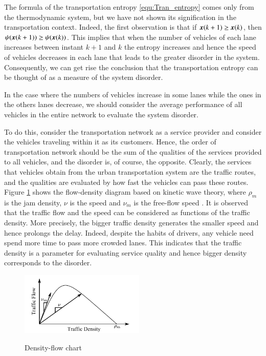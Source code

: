 \documentclass[preprint,authoryear,12pt]{elsarticle}
\renewcommand{\vec}[1]{\mbox{\boldmath$#1$}}
\begin{document}
The formula of the transportation entropy \eqref{equ:Tran_entropy}
comes only from the thermodynamic system, but we have not shown its
signification in the transportation context. Indeed, the first observation 
  is that if $\vec{x}(k+1)\geq \vec{x}(k)$, then $\psi(\vec{x}(k+1))\geq \psi(\vec{x}(k))$. This implies that 
  when the number of
vehicles of each lane increases between instant $k+1$ and $k$ the entropy  increases and hence  the speed of vehicles decreases in each lane that leads to the
greater disorder in the system. Consequently, we can get rise the conclusion that
 the transportation entropy can be thought of as a measure of the system
disorder.

In the case where the numbers of vehicles increase in some lanes while
the ones in the others lanes decrease, we should consider the average
performance of all vehicles in the entire network to evaluate the
system disorder.

\newpage

To do this, consider the
transportation network as a service provider and consider the
vehicles traveling within it as its customers. Hence, the order of
transportation network should be the sum of the qualities of the
services provided to all vehicles, and the disorder is, of course,
the opposite. Clearly, the services that vehicles obtain from the
urban transportation system are the traffic routes, and the qualities
are evaluated by how fast the vehicles can pass these routes. Figure
\ref{fig:d_q} shows the flow-density diagram based on kinetic wave
theory, where $\rho_m$ is the jam density, $\nu$ is the speed and
$\nu_m$ is the free-flow speed \citep{ukkusuri_robust_2010}. It is
observed that the traffic flow and the speed can be considered as
functions of the traffic density. More precisely, the bigger traffic
density generates the smaller speed and hence prolongs the delay.
Indeed, despite the habits of drivers, any vehicle need spend more
time to pass more crowded lanes. This indicates that the traffic
density is a parameter for evaluating service quality and hence
bigger density corresponds to the disorder.

\begin{figure}[ht]
  \centering
  \includegraphics[height=3cm]{pics/d-q}\\
  \caption{Density-flow chart}
  \label{fig:d_q}
\end{figure}
\end{document}
